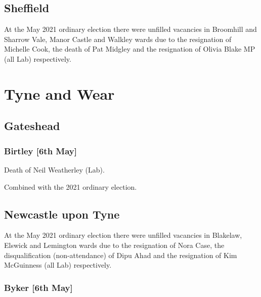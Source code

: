 \documentclass[a4paper,openany]{book}
\begin{document}
\begin{resultsiii}
\subsection*{Sheffield}

At the May 2021 ordinary election there were unfilled vacancies in Broomhill and Sharrow Vale, Manor Castle and Walkley wards due to the resignation of Michelle Cook, the death of Pat Midgley and the resignation of Olivia Blake MP (all Lab) respectively.

\section{Tyne and Wear}

\subsection*{Gateshead}

\subsubsection*{Birtley \hspace*{\fill}\nolinebreak[1]%
	\enspace\hspace*{\fill}
	[6th May]}


Death of Neil Weatherley (Lab).

Combined with the 2021 ordinary election.

\subsection*{Newcastle upon Tyne}

At the May 2021 ordinary election there were unfilled vacancies in Blakelaw, Elswick and Lemington wards due to the resignation of Nora Case, the disqualification (non-attendance) of Dipu Ahad and the resignation of Kim McGuinness (all Lab) respectively.

\subsubsection*{Byker \hspace*{\fill}\nolinebreak[1]%
	\enspace\hspace*{\fill}
	[6th May]}


\end{resultsiii}
\end{document}
